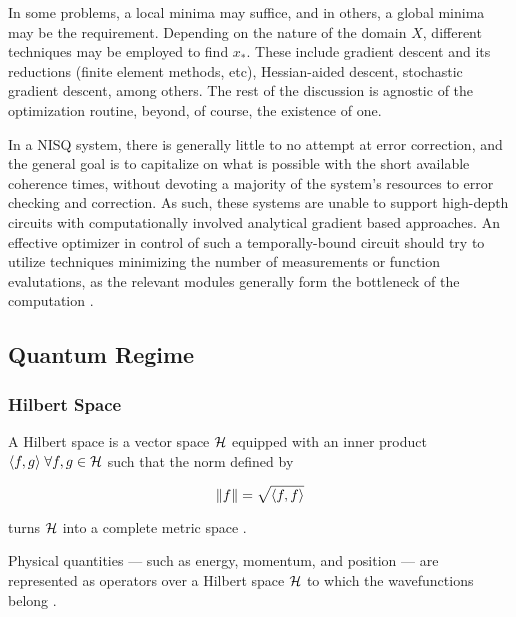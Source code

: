 In some problems, a local minima may suffice, and in others, a global minima may
be the requirement. Depending on the nature of the domain \(X\), different
techniques may be employed to find \(x_*\). These include gradient descent and
its reductions (finite element methods, etc), Hessian-aided descent,  stochastic
gradient descent, among others. The rest of the discussion is agnostic of the
optimization routine, beyond, of course, the existence of one.

In a NISQ system, there is generally little to no attempt at error correction,
and the general goal is to capitalize on what is possible with the short
available coherence times, without devoting a majority of the system's resources
to error checking and correction. As such, these systems are unable to support
high-depth circuits with computationally involved analytical gradient based
approaches. An effective optimizer in control of such a temporally-bound circuit
should try to utilize techniques minimizing the number of measurements or
function evalutations, as the relevant modules generally form the bottleneck of
the computation \cite[see][chapter II.D]{bharti2021noisy}.

\subsection{Quantum Regime}

\subsubsection{Hilbert Space}
\begin{definition}
    A Hilbert space is a vector space \(\mathcal{H}\) equipped with an inner
    product \(\langle f, g\rangle \;\forall f, g \in \mathcal{H}\) such that
    the norm defined by

    \begin{equation*}
        \norm{f} = \sqrt{\langle f, f\rangle}
    \end{equation*}

    turns \(\mathcal{H}\) into a complete metric space
    \cite{sansone1959orthogonal}.
\end{definition}

Physical quantities --- such as energy, momentum, and position --- are
represented as operators over a Hilbert space \(\mathcal{H}\) to which the
wavefunctions belong \cite{hall2013quantum}. 

